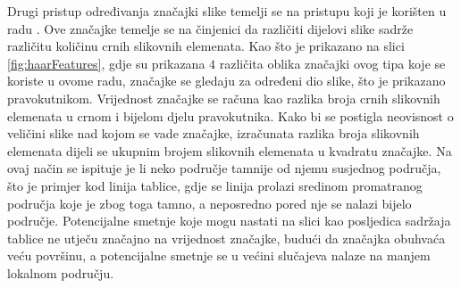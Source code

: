 \documentclass[times, utf8, zavrsni, numeric]{fer}
\begin{document}
Drugi pristup određivanja značajki slike temelji se na pristupu koji je korišten u radu \cite{ViolaJones}.
Ove značajke temelje se na činjenici da različiti dijelovi slike sadrže različitu količinu crnih slikovnih elemenata.
Kao što je prikazano na slici \ref{fig:haarFeatures}, gdje su prikazana $4$ različita oblika značajki ovog tipa koje se koriste u ovome radu, značajke se gledaju za određeni dio slike, što je prikazano pravokutnikom.
Vrijednost značajke se računa kao razlika broja crnih slikovnih elemenata u crnom i bijelom djelu pravokutnika.
Kako bi se postigla neovisnost o veličini slike nad kojom se vade značajke, izračunata razlika broja slikovnih elemenata dijeli se ukupnim brojem slikovnih elemenata u kvadratu značajke.
Na ovaj način se ispituje je li neko područje tamnije od njemu susjednog područja, što je primjer kod linija tablice, gdje se linija prolazi sredinom promatranog područja koje je zbog toga tamno, a neposredno pored nje se nalazi bijelo područje. 
Potencijalne smetnje koje mogu nastati na slici kao posljedica sadržaja tablice ne utječu značajno na vrijednost značajke, budući da značajka obuhvaća veću površinu, a potencijalne smetnje se u većini slučajeva nalaze na manjem lokalnom području.
\end{document}
